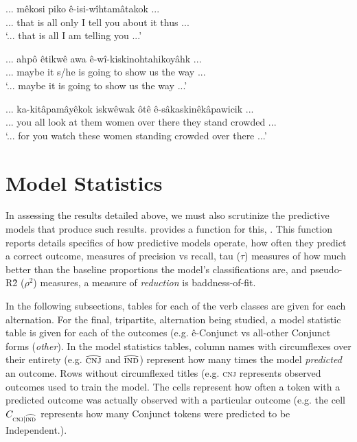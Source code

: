         
    \begin{exe}
    \ex
    \gll ... mêkosi piko ê-isi-wîhtamâtakok ...\\
         ... {that is all} only {I tell you about it thus} ... \\
    \trans `... that is all I am telling you ...' \citep[66]{KaNipitehtew1998}
    \label{cnjta1}
    \end{exe}
    
    \begin{exe}
    \ex
    \gll ... {ahpô êtikwê} awa ê-wî-kiskinohtahikoyâhk ...\\
         ... {maybe} it {s/he is going to show us the way} ... \\
    \trans `... maybe it is going to show us the way ...' \citep[130]{Bearetal1992}
    \label{cnjta2}
    \end{exe}
        
        
    \begin{exe}
    \ex
    \gll ... ka-kitâpamâyêkok iskwêwak ôtê ê-sâkaskinêkâpawicik ...\\
         ... {you all look at them} women {over there} {they stand crowded} ... \\
    \trans `... for you watch these women standing crowded over there ...' \citep[126]{KaNipitehtew1998}
    \label{cnjta3}
    \end{exe}
        
        
        
        
        
        
        

\section{Model Statistics}
In assessing the results detailed above, we must also scrutinize the predictive models that produce such results. \citet{polytomous} provides a function for this, . This function reports details specifics of how predictive models operate, how often they predict a correct outcome, measures of precision vs recall, tau ($\tau$) measures of how much better than the baseline proportions the model's classifications are, and pseudo-R\^{2} ($\rho^{2}$) measures, a measure of \textit{reduction} is baddness-of-fit.

In the following subsections, tables for each of the verb classes are given for each alternation. For the final, tripartite, alternation being studied, a model statistic table is given for each of the outcomes (e.g. ê-Conjunct vs all-other Conjunct forms (\textit{other}). In the model statistics tables, column names with circumflexes over their entirety (e.g. $\widehat{\textsc{cnj}}$ and $\widehat{\textsc{ind}}$) represent how many times the model \textit{predicted} an outcome. Rows without circumflexed titles (e.g. \textsc{cnj} represents observed outcomes used to train the model. The cells represent how often a token with a predicted outcome was actually observed with a particular outcome (e.g. the cell $C_{\textsc{cnj}|\widehat{\textsc{ind}}}$ represents how many Conjunct tokens were predicted to be Independent.).




